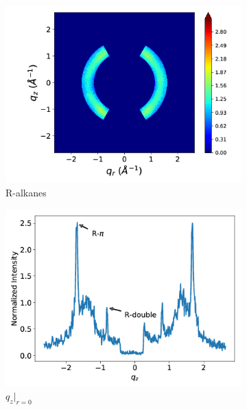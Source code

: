 \documentclass[journal=jpcbfk,manuscript=article]{achemso}
\begin{document}
  \begin{figure}[!htb]
  \centering
  \begin{subfigure}{0.45\linewidth}
  \centering
  \includegraphics[width=\textwidth]{ralkanes.png}
  \caption{R-alkanes}\label{fig:ralkanes}
  \end{subfigure}
  \begin{subfigure}{0.45\linewidth}
  \centering
  \includegraphics[width=\textwidth]{rpi_rdouble.png}
  \caption{$q_z|_{r=0}$}\label{fig:rpi_rdouble}
  \end{subfigure}
  \begin{subfigure}{0.45\linewidth}
  \centering

\end{subfigure}
\end{figure}
\end{document}
